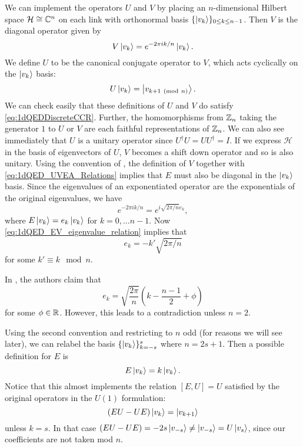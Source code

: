 \documentclass[11pt,reqno]{amsart}
\begin{document}
	We can implement the operators $U$ and $V$ by placing an $n$-dimensional Hilbert space $\mathcal{H}\cong \mathbb{C}^n$ on each link with orthonormal basis $\{\ket{v_k} \}_{0\leq k\leq n-1}$.
	Then $V$ is the diagonal operator given by 
	\begin{equation}
		V\ket{v_k} = e^{-2\pi i k /n} \ket{v_k}.
	\end{equation}
	We define $U$ to be the canonical conjugate operator to $V$, which acts cyclically on the $\ket{v_k}$ basis:
	\begin{equation}
		U\ket{v_k} = \ket{v_{k+1 \ \left(\mathrm{mod}\ n\right)}}.
	\end{equation}
	We can check easily that these definitions of $U$ and $V$ do satisfy \cref{eq:1dQEDDiscreteCCR}.
	Further, the homomorphisms from $\mathbb{Z}_n$ taking the generator $1$ to $U$ or $V$ are each faithful representations of $\mathbb{Z}_n$.
	We can also see immediately that $U$ is a unitary operator since $U^\dagger U = U U^\dagger= I$.
	If we express $\mathcal{H}$ in the basis of eigenvectors of $U$, $V$ becomes a shift down operator and so is also unitary.
	Using the convention of \cite{Ercolessi18}, the definition of $V$ together with \cref{eq:1dQED_UVEA_Relations} implies that $E$ must also be diagonal in the $\ket{v_k}$ basis.
	Since the eigenvalues of an exponentiated operator are the exponentials of the original eigenvalues, we have
	\begin{equation}\label{eq:1dQED_EV_eigenvalue_relation}
		e^{-2\pi i k/n} = e^{i\sqrt{2\pi/n} e_k},
	\end{equation}
	where $E\ket{v_k}=e_k \ket{v_k}$ for $k=0,\ldots n-1$.
	Now \cref{eq:1dQED_EV_eigenvalue_relation} implies that 
	\begin{equation}
		e_k=-k'\sqrt{2\pi/n}
	\end{equation}
	for some $k'\equiv k \mod n$.
	
	In \cite{Ercolessi18}, the authors claim that 
		\[e_k=\sqrt{\frac{2\pi}{n}}\left(k-\frac{n-1}{2}+\phi \right)\]
	for some $\phi \in \mathbb{R}$.
	However, this leads to a contradiction unless $n=2$.
	
	Using the second convention and restricting to $n$ odd (for reasons we will see later), we can relabel the basis $\{\ket{v_k}\}_{k=-s}^s$ where $n=2s+1$. 
	Then a possible definition for $E$ is
	\begin{equation}
		E\ket{v_k}=k \ket{v_k}.
	\end{equation}
	Notice that this almost implements the relation $[E,U]=U$ satisfied by the original operators in the $U(1)$ formulation:
		\[(EU-UE)\ket{v_k}=\ket{v_{k+1}} \]
	unless $k=s$. 
	In that case $(EU-UE)=-2s\ket{v_{-s}} \neq \ket{v_{-s}} = U\ket{v_s}$, since our coefficients are not taken mod $n$.
	
\end{document}
